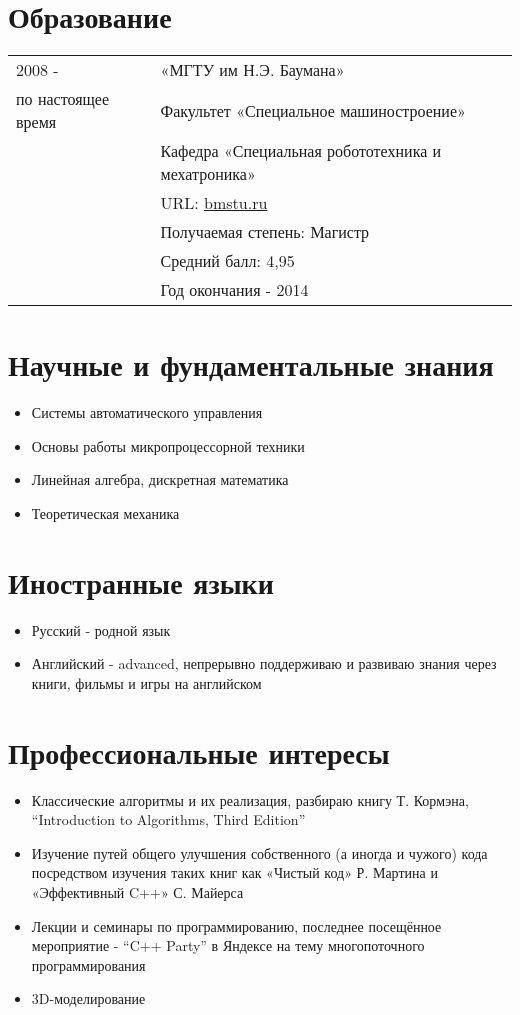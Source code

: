 \documentclass[a4paper, 11pt]{article}
\begin{document}
\section{Образование}
\begin{tabular}{p{25mm}|p{110mm}}
2008 -              & «МГТУ им Н.Э. Баумана»                            \\
по настоящее время  & Факультет «Специальное машиностроение»            \\
                    & Кафедра «Специальная робототехника и мехатроника» \\
                    & URL: \href{http://bmstu.ru}{bmstu.ru}             \\
                    & Получаемая степень: Магистр                       \\
                    & Средний балл: 4,95                                \\
                    & Год окончания - 2014
\end{tabular}

\section{Научные и фундаментальные знания}
\begin{itemize}
    \item Системы автоматического управления
    \item Основы работы микропроцессорной техники
    \item Линейная алгебра, дискретная математика
    \item Теоретическая механика
\end{itemize}

\section{Иностранные языки}
\begin{itemize}
    \item   Русский    - родной язык
    \item   Английский - advanced, непрерывно поддерживаю и развиваю знания через
            книги, фильмы и игры на английском
\end{itemize}

\section{Профессиональные интересы}
\begin{itemize}
    \item   Классические алгоритмы и их реализация, разбираю книгу Т. Кормэна,
            ``Introduction to Algorithms, Third Edition''
    \item   Изучение путей общего улучшения собственного (а иногда и чужого)
            кода посредством изучения таких книг как «Чистый код» Р. Мартина и
            «Эффективный C++» С. Майерса
    \item   Лекции и семинары по программированию, последнее посещённое мероприятие
            - ``C++ Party'' в Яндексе на тему многопоточного программирования
    \item   3D-моделирование
\end{itemize}
\end{document}
